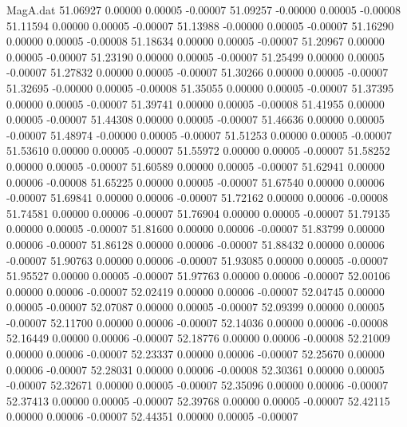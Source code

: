 \begin{filecontents}{MagA.dat}
  51.06927    0.00000    0.00005   -0.00007
  51.09257   -0.00000    0.00005   -0.00008
  51.11594    0.00000    0.00005   -0.00007
  51.13988   -0.00000    0.00005   -0.00007
  51.16290    0.00000    0.00005   -0.00008
  51.18634    0.00000    0.00005   -0.00007
  51.20967    0.00000    0.00005   -0.00007
  51.23190    0.00000    0.00005   -0.00007
  51.25499    0.00000    0.00005   -0.00007
  51.27832    0.00000    0.00005   -0.00007
  51.30266    0.00000    0.00005   -0.00007
  51.32695   -0.00000    0.00005   -0.00008
  51.35055    0.00000    0.00005   -0.00007
  51.37395    0.00000    0.00005   -0.00007
  51.39741    0.00000    0.00005   -0.00008
  51.41955    0.00000    0.00005   -0.00007
  51.44308    0.00000    0.00005   -0.00007
  51.46636    0.00000    0.00005   -0.00007
  51.48974   -0.00000    0.00005   -0.00007
  51.51253    0.00000    0.00005   -0.00007
  51.53610    0.00000    0.00005   -0.00007
  51.55972    0.00000    0.00005   -0.00007
  51.58252    0.00000    0.00005   -0.00007
  51.60589    0.00000    0.00005   -0.00007
  51.62941    0.00000    0.00006   -0.00008
  51.65225    0.00000    0.00005   -0.00007
  51.67540    0.00000    0.00006   -0.00007
  51.69841    0.00000    0.00006   -0.00007
  51.72162    0.00000    0.00006   -0.00008
  51.74581    0.00000    0.00006   -0.00007
  51.76904    0.00000    0.00005   -0.00007
  51.79135    0.00000    0.00005   -0.00007
  51.81600    0.00000    0.00006   -0.00007
  51.83799    0.00000    0.00006   -0.00007
  51.86128    0.00000    0.00006   -0.00007
  51.88432    0.00000    0.00006   -0.00007
  51.90763    0.00000    0.00006   -0.00007
  51.93085    0.00000    0.00005   -0.00007
  51.95527    0.00000    0.00005   -0.00007
  51.97763    0.00000    0.00006   -0.00007
  52.00106    0.00000    0.00006   -0.00007
  52.02419    0.00000    0.00006   -0.00007
  52.04745    0.00000    0.00005   -0.00007
  52.07087    0.00000    0.00005   -0.00007
  52.09399    0.00000    0.00005   -0.00007
  52.11700    0.00000    0.00006   -0.00007
  52.14036    0.00000    0.00006   -0.00008
  52.16449    0.00000    0.00006   -0.00007
  52.18776    0.00000    0.00006   -0.00008
  52.21009    0.00000    0.00006   -0.00007
  52.23337    0.00000    0.00006   -0.00007
  52.25670    0.00000    0.00006   -0.00007
  52.28031    0.00000    0.00006   -0.00008
  52.30361    0.00000    0.00005   -0.00007
  52.32671    0.00000    0.00005   -0.00007
  52.35096    0.00000    0.00006   -0.00007
  52.37413    0.00000    0.00005   -0.00007
  52.39768    0.00000    0.00005   -0.00007
  52.42115    0.00000    0.00006   -0.00007
  52.44351    0.00000    0.00005   -0.00007

\end{filecontents}
